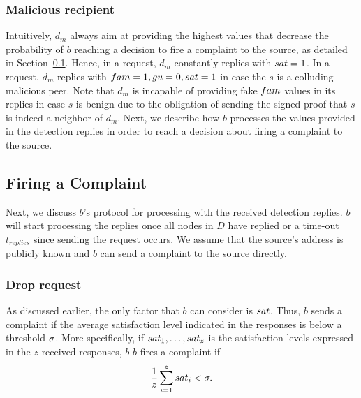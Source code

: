 \subsubsection*{Malicious recipient}


Intuitively, $d_m$ always aim at providing the highest values that decrease the probability of $b$ reaching a decision to fire a complaint to the source, as detailed in Section~\ref{Firing_a_Complain}.
Hence, in a \drop request, $d_m$ constantly replies with $sat=1$.
In a \block request, $d_m$ replies with $fam=1, gu=0, sat=1$ in case the $s$ is a colluding malicious peer.
Note that $d_m$ is incapable of providing fake $fam$ values in its replies in case $s$ is benign due to the obligation of sending the signed proof that $s$ is indeed a neighbor of $d_m$. 
Next, we describe how $b$ processes the values provided in the detection replies in order to reach a decision about firing a complaint to the source.

\subsection{Firing a Complaint}
\label{Firing_a_Complain}
Next, we discuss $b$'s protocol for processing with the received detection replies. $b$ will start processing the replies once all nodes in $D$ have replied or a time-out $t_{replies}$ since sending the request occurs. 
We assume that the source's address is publicly known and $b$ can send a complaint to the source directly.
\subsubsection*{Drop request}
As discussed earlier, the only factor that $b$ can consider is $sat$. Thus, $b$ sends a complaint if the average satisfaction level indicated in the responses is below a threshold $\sigma$.
More specifically, if $sat_1, \ldots , sat_z$ is the satisfaction levels expressed in the $z$ received responses, $b$
$b$ fires a complaint if 
\begin{align}
\label{eq:drop_satis_equation}
\frac{1}{z}\sum_{i=1}^{z} \sat_i< \satThres. 
\end{align} 


